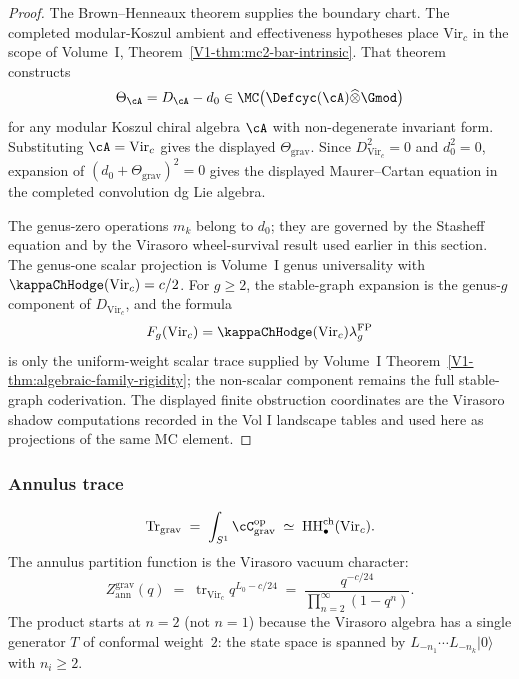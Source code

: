 \begin{proof}
The Brown--Henneaux theorem supplies the boundary chart.  The
completed modular-Koszul ambient and effectiveness hypotheses place
\(\mathrm{Vir}_c\) in the scope of Volume~I,
Theorem~\ref*{V1-thm:mc2-bar-intrinsic}.  That theorem constructs
\[
\Theta_{\cA}=D_\cA-d_0
\in
\MC\bigl(\Defcyc(\cA)\widehat{\otimes}\Gmod\bigr)
\]
for any modular Koszul chiral algebra \(\cA\) with non-degenerate
invariant form.  Substituting \(\cA=\mathrm{Vir}_c\) gives the
displayed \(\Theta_{\mathrm{grav}}\).  Since
\(D_{\mathrm{Vir}_c}^2=0\) and \(d_0^2=0\), expansion of
\((d_0+\Theta_{\mathrm{grav}})^2=0\) gives the displayed
Maurer--Cartan equation in the completed convolution dg Lie algebra.

The genus-zero operations \(m_k\) belong to \(d_0\); they are governed
by the Stasheff equation and by the Virasoro wheel-survival result
used earlier in this section.  The genus-one scalar projection is
Volume~I genus universality with
\(\kappaChHodge(\mathrm{Vir}_c)=c/2\).  For \(g\ge2\), the
stable-graph expansion is the genus-\(g\) component of
\(D_{\mathrm{Vir}_c}\), and the formula
\[
F_g(\mathrm{Vir}_c)
=\kappaChHodge(\mathrm{Vir}_c)\lambda_g^{\mathrm{FP}}
\]
is only the uniform-weight scalar trace supplied by Volume~I
Theorem~\ref*{V1-thm:algebraic-family-rigidity}; the non-scalar
component remains the full stable-graph coderivation.  The displayed
finite obstruction coordinates are the Virasoro shadow computations
recorded in the Vol I landscape tables and used here as projections
of the same MC element.
\end{proof}

\subsubsection*{Annulus trace}

\begin{equation}\label{eq:grav-annulus-trace}
\operatorname{Tr}_{\mathrm{grav}}
\;=\;
\int_{S^1} \cC_{\mathrm{grav}}^{\mathrm{op}}
\;\simeq\;
\HH^{\mathrm{ch}}_\bullet(\mathrm{Vir}_c).
\end{equation}
The annulus partition function is the Virasoro vacuum character:
\begin{equation}\label{eq:grav-annulus-partition}
Z_{\mathrm{ann}}^{\mathrm{grav}}(q)
\;=\;
\operatorname{tr}_{\mathrm{Vir}_c} q^{L_0 - c/24}
\;=\;
\frac{q^{-c/24}}{\prod_{n=2}^{\infty}(1 - q^n)}.
\end{equation}
The product starts at $n = 2$ (not $n = 1$) because the
Virasoro algebra has a single generator $T$ of conformal
weight~$2$: the state space is spanned by $L_{-n_1} \cdots
L_{-n_k}|0\rangle$ with $n_i \ge 2$.

